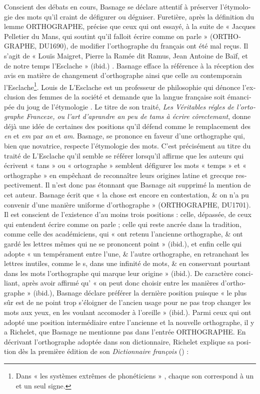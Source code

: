 \documentclass[output=paper,colorlinks,citecolor=brown,arabicfont,chinesefont,booklanguage=french]{langscibook}
\begin{document}
\begin{otherlanguage}{french}
Conscient des débats en cours, Basnage se déclare attentif à préserver l'étymologie des mots qu'il craint de défigurer ou déguiser. Furetière, après la définition du lemme ORTHOGRAPHE, précise que ceux qui ont essayé, à la suite de « Jacques Pelletier du Mans, qui soutint qu’il falloit écrire comme on parle » (ORTHOGRAPHE, DU1690), de modifier l'orthographe du français ont été mal reçus. Il s’agit de « Louïs Maigret, Pierre la Ramée dit Ramus, Jean Antoine de Baïf, et de notre temps l'Esclache » (ibid.) . Basnage efface la référence à la réception des avis en matière de changement d’orthographe ainsi que celle au contemporain l’Esclache\footnote{Dans « les systèmes extrêmes de phonéticiens » \citep[120]{Catach2001}, chaque son correspond à un et un seul signe.}. Louis de L’Esclache est un professeur de philosophie qui dénonce l'exclusion des femmes de la société et demande que la langue française soit émancipée du joug de l'étymologie . Le titre de son traité, \textit{Les Véritables régles de l’ortographe Franceze, ou l’art d’aprandre an peu de tams à écrire côrectemant}, donne déjà une idée de certaines des positions qu'il défend comme le remplacement des \textit{en} et \textit{em} par \textit{an} et \textit{am}. Basnage, se prononce en faveur d'une orthographe qui, bien que novatrice, respecte l'étymologie des mots. C'est précisément au titre du traité de L’Esclache qu’il semble se référer lorsqu'il affirme que les auteurs qui écrivent « tans » ou « ortographe » semblent défigurer les mots « temps » et « orthographe » en empêchant de reconnaître leurs origines latine et grecque respectivement. Il n'est donc pas étonnant que Basnage ait supprimé la mention de cet auteur. Basnage écrit que « la chose est encore en contestation, \& on n'a pu convenir d'une manière uniforme d'orthographe » (ORTHOGRAPHE, DU1701). Il est conscient de l'existence d'au moins trois positions : celle, dépassée, de ceux qui entendent écrire comme on parle ; celle qui reste ancrée dans la tradition, comme celle des académiciens, qui « ont retenu l'ancienne orthographe, \& ont gardé les lettres mêmes qui ne se prononcent point » (ibid.), et enfin celle qui adopte « un tempérament entre l'une, \& l'autre orthographe, en retranchant les lettres inutiles, comme le s, dans une infinité de mots, \& en conservant pourtant dans les mots l'orthographe qui marque leur origine » (ibid.). De caractère conciliant, après avoir affirmé qu' « on peut donc choisir entre les manières d'orthographe » (ibid.), Basnage déclare préférer la dernière position puisque « le plus sûr est de ne point trop s’éloigner de l’ancien usage pour ne pas trop changer les mots aux yeux, en les voulant accomoder à l’oreille » (ibid.). Parmi ceux qui ont adopté une position intermédiaire entre l’ancienne et la nouvelle orthographe, il y a Richelet, que Basnage ne mentionne pas dans l’entrée ORTHOGRAPHE. En décrivant l’orthographe adoptée dans son dictionnaire, Richelet explique sa position dès la première édition de son \emph{Dictionnaire françois} (\citealt{Richelet1680}) :


\end{otherlanguage}
\end{document}
